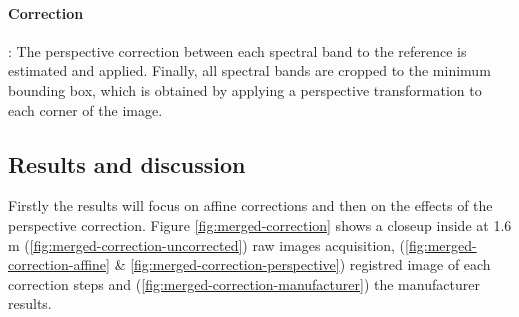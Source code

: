 \documentclass[../thesis.tex]{subfiles}
\begin{document}
	
	\paragraph{Correction} :
	The perspective correction between each spectral band to the reference is estimated and applied.
	Finally, all spectral bands are cropped to the minimum bounding box,
	which is obtained by applying a perspective transformation to each corner of the image.
	
	
	\subsection{Results and discussion}
	
	Firstly the results will focus on affine corrections and then on the effects of the perspective correction.
	Figure \ref{fig:merged-correction} shows a closeup inside at 1.6 m (\ref{fig:merged-correction-uncorrected}) raw images acquisition,
	(\ref{fig:merged-correction-affine} \& \ref{fig:merged-correction-perspective}) registred image of each correction steps
	and (\ref{fig:merged-correction-manufacturer}) the manufacturer results.
	
\end{document}
